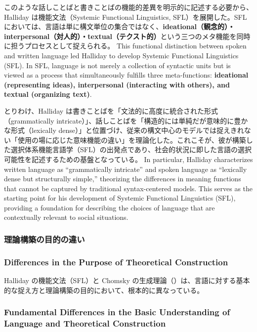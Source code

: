 \ifJPN
このような話しことばと書きことばの機能的差異を明示的に記述する必要から、Halliday は機能文法（Systemic Functional Linguistics, SFL）を展開した。SFL においては、言語は単に構文単位の集合ではなく、\textbf{ideational（観念的）・interpersonal（対人的）・textual（テクスト的）}という三つのメタ機能を同時に担うプロセスとして捉えられる。
\else
  This functional distinction between spoken and written language led Halliday to develop Systemic Functional Linguistics (SFL). In SFL, language is not merely a collection of syntactic units but is viewed as a process that simultaneously fulfills three meta-functions: \textbf{ideational (representing ideas), interpersonal (interacting with others), and textual (organizing text)}.
\fi

\ifJPN
とりわけ、Halliday は書きことばを「文法的に高度に統合された形式（grammatically intricate）」、話しことばを「構造的には単純だが意味的に豊かな形式（lexically dense）」と位置づけ、従来の構文中心のモデルでは捉えきれない「使用の場に応じた意味機能の違い」を理論化した。これこそが、彼が構築した選択体系機能言語学（SFL）の出発点であり、社会的状況に即した言語の選択可能性を記述するための基盤となっている。
\else
In particular, Halliday characterizes written language as ``grammatically intricate'' and spoken language as ``lexically dense but structurally simple,'' theorizing the differences in meaning functions that cannot be captured by traditional syntax-centered models. This serves as the starting point for his development of Systemic Functional Linguistics (SFL), providing a foundation for describing the choices of language that are contextually relevant to social situations.
\fi

\ifJPN
\subsubsection{理論構築の目的の違い}
\else
\subsubsection{Differences in the Purpose of Theoretical Construction}
\fi

\ifJPN
Halliday の機能文法（SFL）と Chomsky の生成理論（\textcite{chomsky1965aspects}）は、言語に対する基本的な捉え方と理論構築の目的において、根本的に異なっている。
\else
  \subsubsection{Fundamental Differences in the Basic Understanding of Language and Theoretical Construction}
\fi


